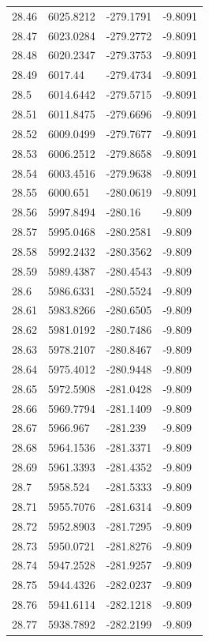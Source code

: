 \begin{table}[H]
\begin{tabular}{llll}
28.46 & 6025.8212 & -279.1791 & -9.8091 \\
28.47 & 6023.0284 & -279.2772 & -9.8091 \\
28.48 & 6020.2347 & -279.3753 & -9.8091 \\
28.49 & 6017.44 & -279.4734 & -9.8091 \\
28.5 & 6014.6442 & -279.5715 & -9.8091 \\
28.51 & 6011.8475 & -279.6696 & -9.8091 \\
28.52 & 6009.0499 & -279.7677 & -9.8091 \\
28.53 & 6006.2512 & -279.8658 & -9.8091 \\
28.54 & 6003.4516 & -279.9638 & -9.8091 \\
28.55 & 6000.651 & -280.0619 & -9.8091 \\
28.56 & 5997.8494 & -280.16 & -9.809 \\
28.57 & 5995.0468 & -280.2581 & -9.809 \\
28.58 & 5992.2432 & -280.3562 & -9.809 \\
28.59 & 5989.4387 & -280.4543 & -9.809 \\
28.6 & 5986.6331 & -280.5524 & -9.809 \\
28.61 & 5983.8266 & -280.6505 & -9.809 \\
28.62 & 5981.0192 & -280.7486 & -9.809 \\
28.63 & 5978.2107 & -280.8467 & -9.809 \\
28.64 & 5975.4012 & -280.9448 & -9.809 \\
28.65 & 5972.5908 & -281.0428 & -9.809 \\
28.66 & 5969.7794 & -281.1409 & -9.809 \\
28.67 & 5966.967 & -281.239 & -9.809 \\
28.68 & 5964.1536 & -281.3371 & -9.809 \\
28.69 & 5961.3393 & -281.4352 & -9.809 \\
28.7 & 5958.524 & -281.5333 & -9.809 \\
28.71 & 5955.7076 & -281.6314 & -9.809 \\
28.72 & 5952.8903 & -281.7295 & -9.809 \\
28.73 & 5950.0721 & -281.8276 & -9.809 \\
28.74 & 5947.2528 & -281.9257 & -9.809 \\
28.75 & 5944.4326 & -282.0237 & -9.809 \\
28.76 & 5941.6114 & -282.1218 & -9.809 \\
28.77 & 5938.7892 & -282.2199 & -9.809 \\

\end{tabular}
\end{table}
